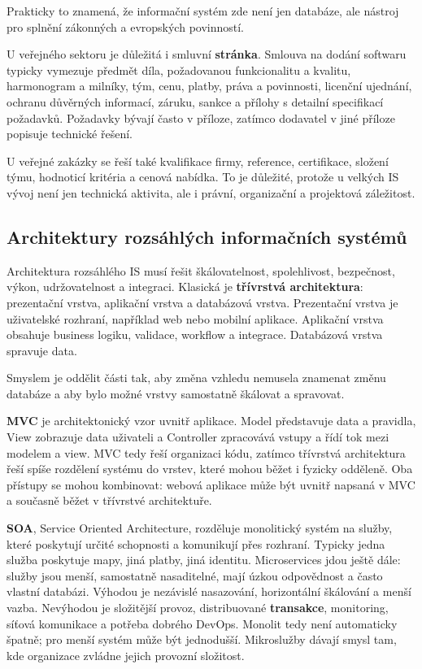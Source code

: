 Prakticky to znamená, že informační systém zde není jen databáze, ale nástroj pro splnění zákonných a evropských povinností.

U veřejného sektoru je důležitá i smluvní \textbf{stránka}. Smlouva na dodání softwaru typicky vymezuje předmět díla, požadovanou funkcionalitu a kvalitu, harmonogram a milníky, tým, cenu, platby, práva a povinnosti, licenční ujednání, ochranu důvěrných informací, záruku, sankce a přílohy s detailní specifikací požadavků. Požadavky bývají často v příloze, zatímco dodavatel v jiné příloze popisuje technické řešení.

U veřejné zakázky se řeší také kvalifikace firmy, reference, certifikace, složení týmu, hodnoticí kritéria a cenová nabídka. To je důležité, protože u velkých IS vývoj není jen technická aktivita, ale i právní, organizační a projektová záležitost.

\subsection*{Architektury rozsáhlých informačních systémů}

Architektura rozsáhlého IS musí řešit škálovatelnost, spolehlivost, bezpečnost, výkon, udržovatelnost a integraci. Klasická je \textbf{třívrstvá architektura}: prezentační vrstva, aplikační vrstva a databázová vrstva. Prezentační vrstva je uživatelské rozhraní, například web nebo mobilní aplikace. Aplikační vrstva obsahuje business logiku, validace, workflow a integrace. Databázová vrstva spravuje data.

Smyslem je oddělit části tak, aby změna vzhledu nemusela znamenat změnu databáze a aby bylo možné vrstvy samostatně škálovat a spravovat.

\textbf{MVC} je architektonický vzor uvnitř aplikace. Model představuje data a pravidla, View zobrazuje data uživateli a Controller zpracovává vstupy a řídí tok mezi modelem a view. MVC tedy řeší organizaci kódu, zatímco třívrstvá architektura řeší spíše rozdělení systému do vrstev, které mohou běžet i fyzicky odděleně. Oba přístupy se mohou kombinovat: webová aplikace může být uvnitř napsaná v MVC a současně běžet v třívrstvé architektuře.

\textbf{SOA}, Service Oriented Architecture, rozděluje monolitický systém na služby, které poskytují určité schopnosti a komunikují přes rozhraní. Typicky jedna služba poskytuje mapy, jiná platby, jiná identitu. Microservices jdou ještě dále: služby jsou menší, samostatně nasaditelné, mají úzkou odpovědnost a často vlastní databázi. Výhodou je nezávislé nasazování, horizontální škálování a menší vazba. Nevýhodou je složitější provoz, distribuované \textbf{transakce}, monitoring, síťová komunikace a potřeba dobrého DevOps. Monolit tedy není automaticky špatně; pro menší systém může být jednodušší. Mikroslužby dávají smysl tam, kde organizace zvládne jejich provozní složitost.

